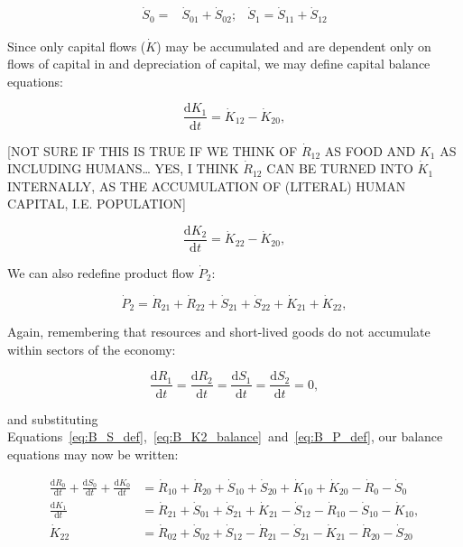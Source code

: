 \begin{align}\label{eq:B_S_def}
	\dot{S}_{0} = 
	& \dot{S}_{01} + \dot{S}_{02};
	& \dot{S}_{1} = 
	\dot{S}_{11} + \dot{S}_{12}
\end{align}

Since only capital flows ($\dot{K}$) may be accumulated and are dependent only on flows of capital in and depreciation of capital, we may define capital balance equations:

\begin{equation} \label{eq:B_K1_balance}
	\frac{\mathrm{d}K_{1}}{\mathrm{d}t}
	=  \dot{K}_{12} - \dot{K}_{20},
\end{equation}

[NOT SURE IF THIS IS TRUE IF WE THINK OF $\dot{R}_{12}$ AS FOOD AND $K_{1}$ 
AS INCLUDING HUMANS\ldots 
YES, I THINK $\dot{R}_{12}$ CAN BE TURNED INTO  $\dot{K}_{1}$ INTERNALLY, 
AS THE ACCUMULATION OF (LITERAL) HUMAN CAPITAL, I.E. POPULATION]

\begin{equation} \label{eq:B_K2_balance}
	\frac{\mathrm{d}K_{2}}{\mathrm{d}t}
	=  \dot{K}_{22} - \dot{K}_{20},
\end{equation}

We can also redefine product flow $\dot{P}_{2}$:

\begin{equation} \label{eq:B_P_def}
	\dot{P}_{2}
	= \dot{R}_{21}
	+ \dot{R}_{22}
	+ \dot{S}_{21}
	+ \dot{S}_{22}
	+ \dot{K}_{21}	 
	+ \dot{K}_{22},
\end{equation}


\noindent Again, remembering that resources and short-lived
goods do not accumulate within sectors of the economy:

\begin{equation}\label{eq:dR_and_dS_zero}
	\frac{\mathrm{d}R_{1}}{\mathrm{d}t}
	= \frac{\mathrm{d}R_{2}}{\mathrm{d}t} 
	= \frac{\mathrm{d}S_{1}}{\mathrm{d}t} 
	= \frac{\mathrm{d}S_{2}}{\mathrm{d}t} 
	= 0,
\end{equation}

\noindent{}and substituting
Equations~\ref{eq:B_S_def},~\ref{eq:B_K2_balance}~and~\ref{eq:B_P_def}, 
our balance equations may now be written:

\begin{align} \label{eq:B_CV_0_to_2_b}
	\frac{\mathrm{d}R_{0}}{\mathrm{d}t} 
	+ \frac{\mathrm{d}S_{0}}{\mathrm{d}t}	
	+ \frac{\mathrm{d}K_0}{\mathrm{d}t}		
	& = \dot{R}_{10} + \dot{R}_{20} 
	+ \dot{S}_{10} + \dot{S}_{20} 
	+ \dot{K}_{10} + \dot{K}_{20} 
	- \dot{R}_{0} 
	- \dot{S}_{0} 							\\
	\frac{\mathrm{d}K_{1}}{\mathrm{d}t}	
	& = \dot{R}_{21} 
	+ \dot{S}_{01} 
	+ \dot{S}_{21}
	+ \dot{K}_{21}
	- \dot{S}_{12} 
	- \dot{R}_{10} 
	- \dot{S}_{10} 
	- \dot{K}_{10},							\\
	\dot{K}_{22}
	& = \dot{R}_{02} 
	+ \dot{S}_{02} 
	+ \dot{S}_{12} 
	- \dot{R}_{21}
	- \dot{S}_{21}
	- \dot{K}_{21}
	- \dot{R}_{20} 
	- \dot{S}_{20} 
\end{align}


